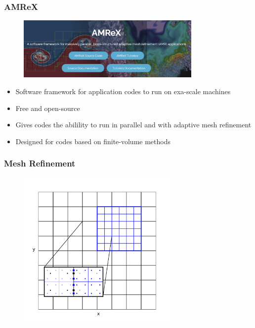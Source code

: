 \documentclass{beamer}
\begin{document}
\begin{frame}
\frametitle{AMReX}

  \begin{figure}[htb!]
    \centering
    \includegraphics[width=0.8\textwidth]{fig.amrex.png}
  \end{figure}

  \begin{itemize}
    \item
      Software framework for application codes to run on exa-scale machines
    \item
      Free and open-source
    \item
      Gives codes the abilility to run in parallel and with adaptive mesh
      refinement
    \item
      Designed for codes based on finite-volume methods
  \end{itemize}

\end{frame}

\begin{frame}
\frametitle{Mesh Refinement}

  \begin{figure}[htb!]
    \centering
    \includegraphics[width=0.7\textwidth]{fig.MeshRefinement_2D.png}
  \end{figure}

\end{frame}
\end{document}
